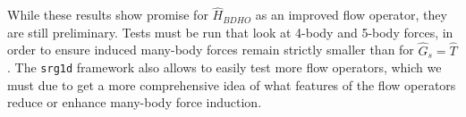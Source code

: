 While these results show promise for $\hat{H}_{BDHO}$ as an improved flow operator, they are still preliminary. Tests must be run that look at 4-body and 5-body forces, in order to ensure induced many-body forces remain strictly smaller than for $\hat{G}_s=\hat{T}$. The \texttt{srg1d} framework also allows to easily test more flow operators, which we must due to get a more comprehensive idea of what features of the flow operators reduce or enhance many-body force induction.


